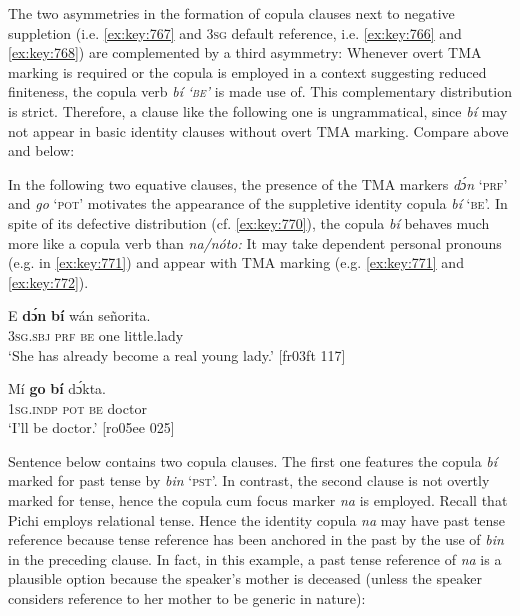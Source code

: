 The two asymmetries in the formation of copula clauses next to negative suppletion (i.e. \ref{ex:key:767} and \textsc{3sg} default reference, i.e. \ref{ex:key:766} and \ref{ex:key:768}) are complemented by a third asymmetry: Whenever overt \textsc{TMA} marking is required or the copula is employed in a context suggesting reduced finiteness, the copula verb \textit{bí} \textit{\textsc{‘be’}} is made use of. This complementary distribution is strict. Therefore, a clause like the following one is ungrammatical, since \textit{bí} may not appear in basic identity clauses without overt TMA marking. Compare  above and  below: 



\z

In the following two equative clauses, the presence of the \textsc{TMA} markers \textit{dɔ́n} ‘\textsc{prf}’  and \textit{go} ‘\textsc{pot}’  motivates the appearance of the suppletive identity copula \textit{bí} ‘\textsc{be’.} In spite of its defective distribution (cf. \ref{ex:key:770}), the copula \textit{bí} behaves much more like a copula verb than \textit{na}\textit{\textup{/}}\textit{nóto:} It may take dependent personal pronouns (e.g. in \ref{ex:key:771}) and appear with TMA marking (e.g. \ref{ex:key:771} and \ref{ex:key:772}). 


\ea%
    \label{ex:key:771}
    \gll E   \textbf{dɔ́n}  \textbf{bí}  wán    señorita.\\
\textsc{3sg.sbj}  \textsc{prf}  \textsc{be}  one    little.lady\\

\glt ‘She has already become a real young lady.’ [fr03ft 117]
\z


\ea%
    \label{ex:key:772}
    \gll Mí    \textbf{go}  \textbf{bí}  dɔ́kta.\\
\textsc{1sg.indp}  \textsc{pot}  \textsc{be}  doctor\\

\glt ‘I’ll be doctor.’ [ro05ee 025]
\z

Sentence  below contains two copula clauses. The first one features the copula \textit{bí} marked for past tense by \textit{bin} ‘\textsc{pst}’. In contrast, the second clause is not overtly marked for tense, hence the copula cum focus marker \textit{na} is employed. Recall that Pichi employs relational tense. Hence the identity copula \textit{na} may have past tense reference because tense reference has been anchored in the past by the use of \textit{bin} in the preceding clause. In fact, in this example, a past tense reference of \textit{na} is a plausible option because the speaker’s mother is deceased (unless the speaker considers reference to her mother to be generic in nature): 


